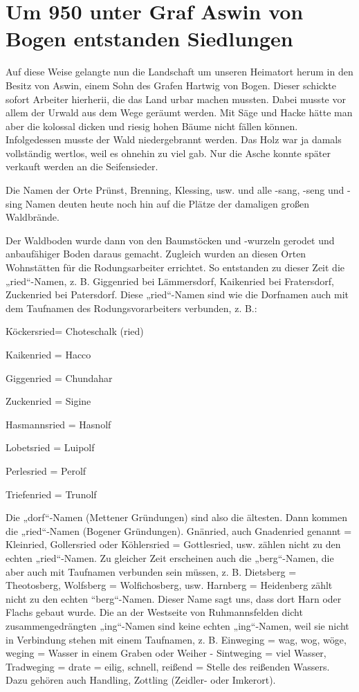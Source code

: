 \documentclass[12pt,a4paper]{book}
\begin{document}
\section{Um 950 unter Graf Aswin von Bogen entstanden Siedlungen}

Auf diese Weise gelangte nun die Landschaft um unseren Heimatort herum in den
Besitz von Aswin, einem Sohn des Grafen Hartwig von Bogen. Dieser schickte
sofort Arbeiter hierherii, die das Land urbar machen mussten. Dabei musste vor
allem der Urwald aus dem Wege geräumt werden. Mit Säge und Hacke hätte man aber
die kolossal dicken und riesig hohen Bäume nicht fällen können. Infolgedessen
musste der Wald niedergebrannt werden. Das Holz war ja damals vollständig
wertlos, weil es ohnehin zu viel gab. Nur die Asche konnte später verkauft
werden an die Seifensieder.

Die Namen der Orte Prünst, Brenning, Klessing, usw. und alle -sang, -seng und
-sing Namen deuten heute noch hin auf die Plätze der damaligen großen
Waldbrände.

Der Waldboden wurde dann von den Baumstöcken und -wurzeln gerodet und
anbaufähiger Boden daraus gemacht. Zugleich wurden an diesen Orten Wohnstätten
für die Rodungsarbeiter errichtet. So entstanden zu dieser Zeit die
„ried“-Namen, z. B. Giggenried bei Lämmersdorf, Kaikenried bei Fratersdorf,
Zuckenried bei Patersdorf. Diese „ried“-Namen sind wie die Dorfnamen auch mit
dem Taufnamen des Rodungsvorarbeiters verbunden, z. B.:

Köckersried= Choteschalk (ried)

Kaikenried = Hacco

Giggenried = Chundahar

Zuckenried = Sigine

Hasmannsried = Hasnolf

Lobetsried = Luipolf

Perlesried = Perolf

Triefenried = Trunolf

Die „dorf“-Namen (Mettener Gründungen) sind also die ältesten. Dann kommen die
„ried“-Namen (Bogener Gründungen). Gnänried, auch Gnadenried genannt =
Kleinried, Gollersried oder Köhlersried = Gottlesried, usw. zählen nicht zu den
echten „ried“-Namen. Zu gleicher Zeit erscheinen auch die „berg“-Namen, die aber
auch mit Taufnamen verbunden sein müssen, z. B. Dietsberg = Theotosberg,
Wolfsberg = Wolfichosberg, usw. Harnberg = Heidenberg zählt nicht zu den echten
“berg“-Namen. Dieser Name sagt uns, dass dort Harn oder Flachs gebaut wurde. Die
an der Westseite von Ruhmannsfelden dicht zusammengedrängten „ing“-Namen sind
keine echten „ing“-Namen, weil sie nicht in Verbindung stehen mit einem
Taufnamen, z. B. Einweging = wag, wog, wöge, weging = Wasser in einem Graben
oder Weiher - Sintweging = viel Wasser, Tradweging = drate = eilig, schnell,
reißend = Stelle des reißenden Wassers. Dazu gehören auch Handling, Zottling
(Zeidler- oder Imkerort).
\end{document}
